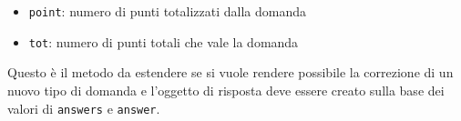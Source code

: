 \documentclass[12pt,a4paper]{article}
\begin{document}
\begin{itemize}
	\begin{itemize}
	\item \texttt{point}: numero di punti totalizzati dalla domanda
	\item \texttt{tot}: numero di punti totali che vale la domanda
	\end{itemize}
	Questo è il metodo da estendere se si vuole rendere possibile la correzione di un nuovo tipo di domanda e l’oggetto di risposta deve essere creato sulla base dei valori di \texttt{answers} e \texttt{answer}.
	\end{itemize}

	\newpage
\end{document}
